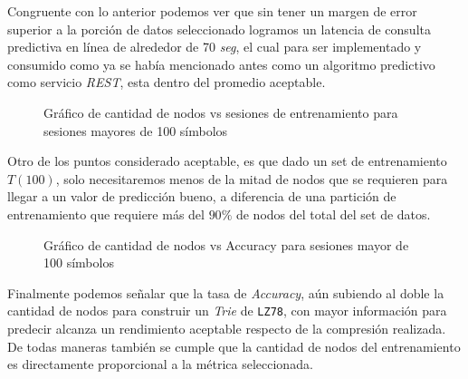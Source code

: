 	Congruente con lo anterior podemos ver que sin tener un margen de error superior a la porción de datos seleccionado logramos un latencia de consulta predictiva en línea de alrededor de 70 \emph{seg}, el cual para ser implementado y consumido como ya se había mencionado antes como un algoritmo predictivo como servicio \emph{REST}, esta dentro del promedio aceptable.

	\begin{figure}[h] 
		\centering
		\caption{Gráfico de cantidad de nodos vs sesiones de entrenamiento para sesiones mayores de 100 símbolos}
	  \label{fig:sim}
	\end{figure}


	Otro de los puntos  considerado aceptable, es que dado un set de entrenamiento $T(100)$, solo necesitaremos menos de la mitad de nodos que se requieren para llegar a un valor de predicción bueno, a diferencia de una partición de entrenamiento que requiere más del $90\%$ de nodos del total del set de datos.\\
	


\begin{figure}[h] 
	\centering
		\caption{Gráfico de cantidad de nodos vs Accuracy para sesiones mayor de 100 símbolos}
	\label{fig:sim}
\end{figure}



	Finalmente podemos señalar que la tasa de \emph{Accuracy}, aún  subiendo al doble la cantidad de nodos para construir un \emph{Trie} de \texttt{LZ78}, con mayor información  para predecir alcanza un rendimiento aceptable respecto de la compresión realizada. De todas maneras también se cumple que la cantidad de nodos del entrenamiento es directamente proporcional a la métrica seleccionada.